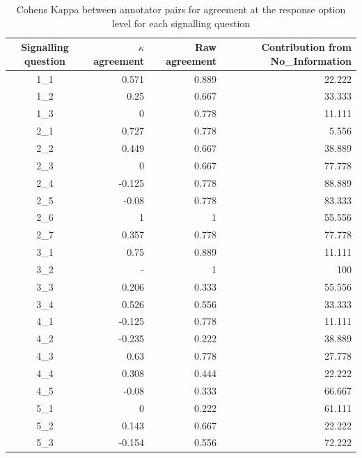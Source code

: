 \documentclass[sn-mathphys,Numbered]{sn-jnl}%
\theoremstyle{thmstyleone}%
\theoremstyle{thmstyletwo}%
\theoremstyle{thmstylethree}%
\begin{document}
\begin{table}[]
    \caption{Cohens Kappa between annotator pairs for agreement at the response option level for each signalling question}
    \label{tab:IAA_response}
    \begin{tabular}{crrr}
        \hline
        Signalling question & $\kappa$ agreement & Raw agreement & Contribution from No\_Information \\
        \hline
        1\_1 & 0.571 & 0.889 & 22.222 \\
        1\_2 & 0.25 & 0.667 & 33.333 \\
        1\_3 & 0 & 0.778 & 11.111 \\
        2\_1 & 0.727 & 0.778 & 5.556 \\
        2\_2 & 0.449 & 0.667 & 38.889 \\
        2\_3 & 0 & 0.667 & 77.778 \\
        2\_4 & -0.125 & 0.778 & 88.889 \\
        2\_5 & -0.08 & 0.778 & 83.333 \\
        2\_6 & 1 & 1 & 55.556 \\
        2\_7 & 0.357 & 0.778 & 77.778 \\
        3\_1 & 0.75 & 0.889 & 11.111 \\
        3\_2 & - & 1 & 100 \\
        3\_3 & 0.206 & 0.333 & 55.556 \\
        3\_4 & 0.526 & 0.556 & 33.333 \\
        4\_1 & -0.125 & 0.778 & 11.111 \\
        4\_2 & -0.235 & 0.222 & 38.889 \\
        4\_3 & 0.63 & 0.778 & 27.778 \\
        4\_4 & 0.308 & 0.444 & 22.222 \\
        4\_5 & -0.08 & 0.333 & 66.667 \\
        5\_1 & 0 & 0.222 & 61.111 \\
        5\_2 & 0.143 & 0.667 & 22.222 \\
        5\_3 & -0.154 & 0.556 & 72.222 \\
        \hline
    \end{tabular}
\end{table}

%
%
%
%
\end{document}
